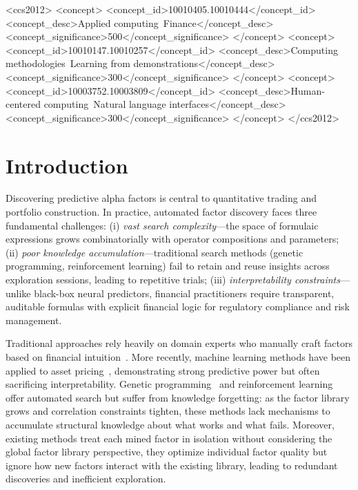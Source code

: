 \documentclass[sigconf]{acmart}
\begin{document}
\begin{CCSXML}
<ccs2012>
  <concept>
    <concept_id>10010405.10010444</concept_id>
    <concept_desc>Applied computing~Finance</concept_desc>
    <concept_significance>500</concept_significance>
  </concept>
  <concept>
    <concept_id>10010147.10010257</concept_id>
    <concept_desc>Computing methodologies~Learning from demonstrations</concept_desc>
    <concept_significance>300</concept_significance>
  </concept>
  <concept>
    <concept_id>10003752.10003809</concept_id>
    <concept_desc>Human-centered computing~Natural language interfaces</concept_desc>
    <concept_significance>300</concept_significance>
  </concept>
</ccs2012>
\end{CCSXML}


\maketitle

\section{Introduction}

Discovering predictive alpha factors is central to quantitative trading and portfolio construction.
In practice, automated factor discovery faces three fundamental challenges:
(i) \emph{vast search complexity}---the space of formulaic expressions grows combinatorially with operator compositions and parameters;
(ii) \emph{poor knowledge accumulation}---traditional search methods (genetic programming, reinforcement learning) fail to retain and reuse insights across exploration sessions, leading to repetitive trials;
(iii) \emph{interpretability constraints}---unlike black-box neural predictors, financial practitioners require transparent, auditable formulas with explicit financial logic for regulatory compliance and risk management.

Traditional approaches rely heavily on domain experts who manually craft factors based on financial intuition~\citep{kakushadze2016alphas,fama1993common}.
More recently, machine learning methods have been applied to asset pricing~\citep{gu2020mlassetpricing,feng2020taming}, demonstrating strong predictive power but often sacrificing interpretability.
Genetic programming~\citep{koza1992genetic} and reinforcement learning~\citep{yu2023alphagen,zhao2025quantfactor} offer automated search but suffer from knowledge forgetting: as the factor library grows and correlation constraints tighten, these methods lack mechanisms to accumulate structural knowledge about what works and what fails.
Moreover, existing methods treat each mined factor in isolation without considering the global factor library perspective, they optimize individual factor quality but ignore how new factors interact with the existing library, leading to redundant discoveries and inefficient exploration.
\end{document}
